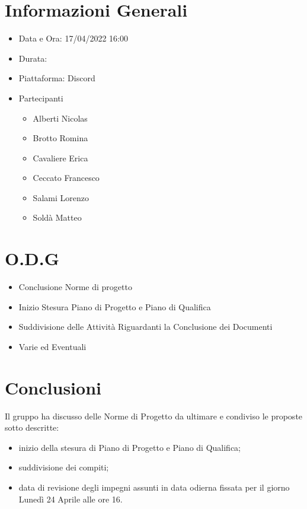 \documentclass[a4paper, 12pt]{article}
\begin{document}
\makefrontpage

\section*{Informazioni Generali}
\begin{itemize}
    \item Data e Ora: 17/04/2022 16:00
    \item Durata: 
    \item Piattaforma: Discord
    \item Partecipanti
    \begin{itemize}
        \item Alberti Nicolas
        \item Brotto Romina
        \item Cavaliere Erica
        \item Ceccato Francesco
        \item Salami Lorenzo
        \item Soldà Matteo
    \end{itemize}
\end{itemize}

\section*{O.D.G}
\begin{itemize}
    \item Conclusione Norme di progetto
    \item Inizio Stesura Piano di Progetto e Piano di Qualifica
    \item Suddivisione delle Attività Riguardanti la Conclusione dei Documenti
    \item Varie ed Eventuali
\end{itemize}

\section*{Conclusioni}
Il gruppo ha discusso delle Norme di Progetto da ultimare e condiviso le proposte sotto descritte:
\begin{itemize}
    \item inizio della stesura di Piano di Progetto e Piano di Qualifica;
    \item suddivisione dei compiti;
    \item data di revisione degli impegni assunti in data odierna fissata per il giorno Lunedì 24 Aprile alle ore 16.
\end{itemize}
\end{document}
